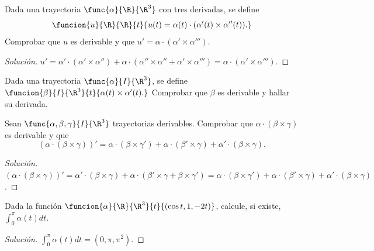 \documentclass[a4,11pt]{aleph-notas}
\begin{document}
\begin{ejer}
    Dada una trayectoria $\func{\alpha}{\R}{\R^3}$ con tres derivadas, se define
    \[
        \funcion{u}{\R}{\R}{t}{u(t)=\alpha(t)\cdot(\alpha'(t)\times \alpha''(t)).}
    \]
    Comprobar que $u$ es derivable y que $u'=\alpha\cdot(\alpha'\times \alpha''')$.
\end{ejer}

\begin{proof}[Solución]
    $u'=\alpha'\cdot(\alpha'\times\alpha'')+\alpha\cdot(\alpha''\times\alpha''+\alpha'\times\alpha''')=\alpha\cdot(\alpha'\times\alpha''')$.
\end{proof}

\begin{ejer}
    Dada una trayectoria $\func{\alpha}{I}{\R^3}$, se define
    $\funcion{\beta}{I}{\R^3}{t}{\alpha(t)\times \alpha'(t).}$
    Comprobar que $\beta$ es derivable y hallar su derivada.
\end{ejer}

\begin{ejer}
    Sean $\func{\alpha,\beta,\gamma}{I}{\R^3}$ trayectorias derivables. Comprobar que $\alpha \cdot (\beta \times \gamma)$ es derivable y que
    \[
        (\alpha \cdot (\beta \times \gamma))' = \alpha \cdot (\beta \times \gamma') + \alpha \cdot (\beta' \times \gamma) + \alpha' \cdot (\beta \times \gamma).
    \]

\end{ejer}

\begin{proof}[Solución]
    $(\alpha \cdot (\beta \times \gamma))'= \alpha' \cdot(\beta \times \gamma)+\alpha\cdot(\beta'\times\gamma+\beta\times\gamma')=\alpha\cdot(\beta\times\gamma')+\alpha\cdot(\beta'\times\gamma)+\alpha'\cdot(\beta\times\gamma)$.
\end{proof}

\begin{ejer}
    Dada la función $\funcion{\alpha}{\R}{\R^3}{t}{(\cos t , 1, -2t)}$, calcule, si existe,
    $\int_0^{\pi} \alpha(t) dt$.

\end{ejer}

\begin{proof}[Solución]
    $\int_0^{\pi} \alpha(t) dt = (0,\pi,\pi^2)$.
\end{proof}
\end{document}
